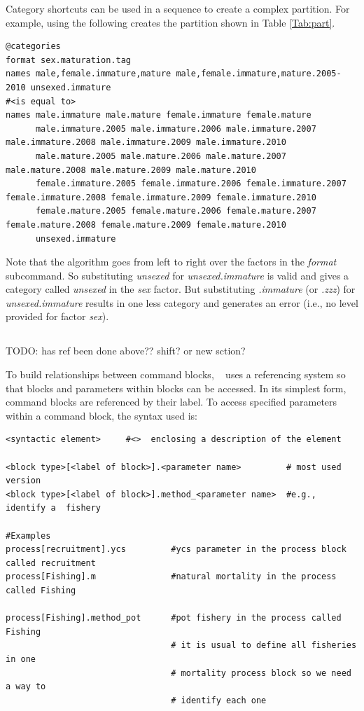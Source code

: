 Category shortcuts can be used in a sequence to create a complex partition. For example, using the following creates the partition shown in Table \ref{Tab:part}.

{\small{\begin{lstlisting}
@categories
format sex.maturation.tag
names male,female.immature,mature male,female.immature,mature.2005-2010 unsexed.immature 
#<is equal to>
names male.immature male.mature female.immature female.mature
      male.immature.2005 male.immature.2006 male.immature.2007 male.immature.2008 male.immature.2009 male.immature.2010
      male.mature.2005 male.mature.2006 male.mature.2007 male.mature.2008 male.mature.2009 male.mature.2010
      female.immature.2005 female.immature.2006 female.immature.2007 female.immature.2008 female.immature.2009 female.immature.2010
      female.mature.2005 female.mature.2006 female.mature.2007 female.mature.2008 female.mature.2009 female.mature.2010      
      unsexed.immature
\end{lstlisting}}}

Note that the algorithm goes from left to right over the factors in the \textit{format} subcommand. So substituting \textit{unsexed} for \textit{unsexed.immature} is valid and gives a category called \textit{unsexed} in the \textit{sex} factor. But substituting \textit{.immature} (or \textit{.zzz}) for \textit{unsexed.immature} results in one less category and generates an error (i.e., no level provided for factor \textit{sex}).

\subsection{\label{sec:params}}

TODO: has ref been done above?? shift? or new sction?

To build relationships between command blocks, \CNAME~ uses  a referencing system so that blocks and parameters within blocks can be accessed. In its simplest form, command blocks are referenced by their label. To access specified parameters within a command block, the syntax used is:

{\small{\begin{verbatim}
<syntactic element>     #<>  enclosing a description of the element

<block type>[<label of block>].<parameter name>         # most used version
<block type>[<label of block>].method_<parameter name>  #e.g., identify a  fishery

#Examples
process[recruitment].ycs         #ycs parameter in the process block called recruitment
process[Fishing].m               #natural mortality in the process called Fishing

process[Fishing].method_pot      #pot fishery in the process called Fishing
                                 # it is usual to define all fisheries in one 
                                 # mortality process block so we need a way to
                                 # identify each one
\end{verbatim}}}

